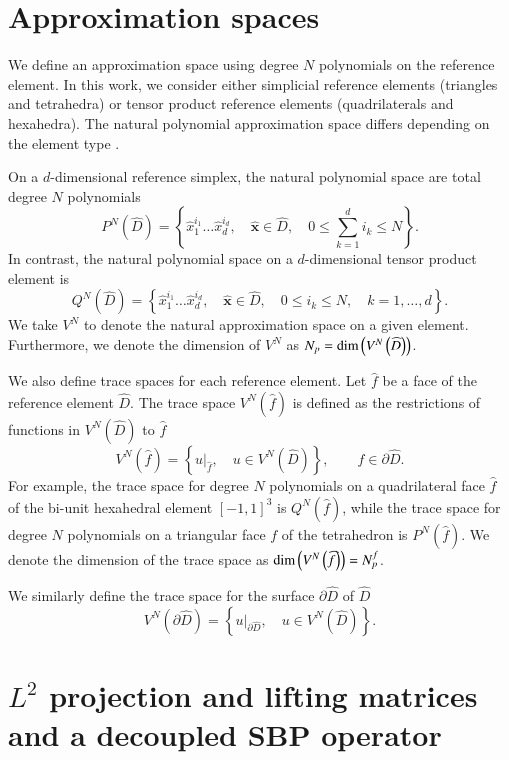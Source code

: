 \documentclass[preprint,10pt]{elsarticle}
\theoremstyle{definition}
\theoremstyle{lemma}
\theoremstyle{corollary}
\theoremstyle{theorem}
\theoremstyle{assumption}
\renewcommand{\hat}[1]{\widehat{#1}}
\newcommand{\LRp}[1]{\left( #1 \right)}
\newcommand{\LRc}[1]{\left\{ #1 \right\}}
\begin{document}
\section{Approximation spaces}

We define an approximation space using degree $N$ polynomials on the reference element.  In this work, we consider either simplicial reference elements (triangles and tetrahedra) or tensor product reference elements (quadrilaterals and hexahedra).  The natural polynomial approximation space differs depending on the element type \cite{chan2015gpu}.  

On a $d$-dimensional reference simplex, the natural polynomial space are total degree $N$ polynomials 
\[
P^N\LRp{\widehat{D}} = \LRc{\hat{x}_1^{i_1}\ldots\hat{x}_d^{i_d}, \quad \hat{\bm{x}} \in \widehat{D}, \quad 0\leq \sum_{k=1}^d i_k \leq N}.
\]
In contrast, the natural polynomial space on a $d$-dimensional tensor product element is 
\[
Q^N\LRp{\widehat{D}} = \LRc{\hat{x}_1^{i_1}\ldots\hat{x}_d^{i_d}, \quad \hat{\bm{x}} \in \widehat{D}, \quad 0\leq i_k \leq N, \quad k = 1,\ldots, d}.
\]
We take $V^N$ to denote the natural approximation space on a given element.  Furthermore, we denote the dimension of $V^N$  as $N_p = {\rm dim}\LRp{V^N\LRp{\widehat{D}}}$.  

We also define trace spaces for each reference element.  Let $\hat{f}$ be a face of the reference element $\hat{D}$.  The trace space $V^N \LRp{\hat{f}}$ is defined as the restrictions of functions in $V^N\LRp{\hat{D}}$ to $\hat{f}$
\[
V^N \LRp{\hat{f}} = \LRc{ \left.u\right|_{\hat{f}}, \quad u \in V^N\LRp{\hat{D}}}, \qquad \hat{f}\in \partial\hat{D}.
\]
For example, the trace space for degree $N$ polynomials on a quadrilateral face $\hat{f}$ of the bi-unit hexahedral element $[-1,1]^3$ is $Q^N\LRp{\hat{f}}$, while the trace space for degree $N$ polynomials on a triangular face $f$ of the tetrahedron is $P^N\LRp{\hat{f}}$.  We denote the dimension of the trace space as ${\rm dim}\LRp{V^N\LRp{{\hat{f}}}} = N^f_p$.  

We similarly define the trace space for the surface $\partial \hat{D}$ of $\hat{D}$
\[
V^N \LRp{\partial \hat{D}} = \LRc{ \left.u\right|_{\partial \hat{D}}, \quad u \in V^N\LRp{\hat{D}}}.
\]



\section{$L^2$ projection and lifting matrices and a decoupled SBP operator}
\end{document}
